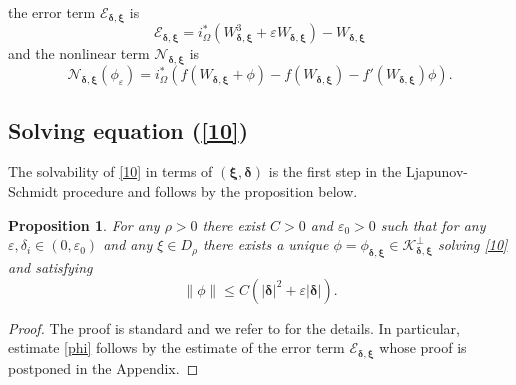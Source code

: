 \documentclass[11pt,a4paper]{amsart}
\newcommand{\e}{\varepsilon}
\renewcommand{\d }{\delta }
\newtheorem{proposition}[theorem]{Proposition}
\theoremstyle{definition}
\renewcommand{\(}{\left(}
\renewcommand{\)}{\right)}
\begin{document}
the error term $\mathcal{E}_{\pmb{\d}, \pmb{\xi}}$ is 
\begin{equation}\label{30}
\mathcal{E}_{\pmb{\d}, \pmb{\xi}}= i^{*}_\Omega(W_{\pmb{\d}, \pmb{\xi}}^{3} + \varepsilon W_{\pmb{\d}, \pmb{\xi}}) - W_{\pmb{\d}, \pmb{\xi}}
\end{equation}
and the nonlinear term $\mathcal{N}_{\pmb{\d}, \pmb{\xi}}$ is 
\begin{equation}\label{31}
\mathcal{N}_{\pmb{\d}, \pmb{\xi}}(\phi_\e) = i^{*}_\Omega\left(f(W_{\pmb{\d}, \pmb{\xi}}+\phi)-f(W_{\pmb{\d}, \pmb{\xi}})-f'(W_{\pmb{\d}, \pmb{\xi}})\phi\right).
\end{equation}

\subsection{Solving equation (\ref{10})}
The solvability of \eqref{10} in terms of $(\boldsymbol\xi,\boldsymbol\delta)$ is the first step in the Ljapunov-Schmidt procedure and follows by the proposition below.
\begin{proposition}\label{fixedpoint}
For any $\rho>0$ there exist $C>0$ and $\varepsilon_{0}>0$ such that for any $\varepsilon, \d_i \in (0, \varepsilon_{0})$ and any $\xi\in D_\rho$ there exists a unique $\phi=\phi_{\pmb{\d}, \pmb{\xi}}\in \mathcal K^{\perp}_{\pmb{\d}, \pmb{\xi}}$ solving \eqref{10} and satisfying 
\begin{equation}\label{phi}
\| \phi \| \leq C\( |\pmb{\d}|^2+\e|\pmb{\d}|\).\end{equation}
\end{proposition}
\begin{proof} The proof is standard and we refer to  \cite{MP,PR} for the details. In particular, estimate \eqref{phi} follows by the estimate of the error term $\mathcal{E}_{\pmb{\d}, \pmb{\xi}}$ whose proof is postponed in the Appendix.
\end{proof}
\end{document}
